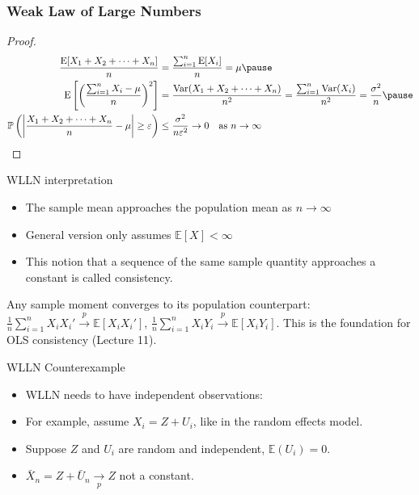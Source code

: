 \documentclass[handout, aspectratio=169]{beamer}
\numberwithin{equation}{section}
\begin{document}

\begin{frame}
\frametitle{Weak Law of Large Numbers}

\begin{proof}
\begin{align*}
\frac{\text{E}[X_{1} + X_{2} + \cdots + X_{n} ]}{n}
&= \frac{\sum_{i=1}^{n} \text{E}[X_{i}] }{n} = \mu
\pause \\
\text{E}\left[ \left( \frac{\sum_{i=1}^{n} X_{i} - \mu}{n} \right)^2 \right]
&= \frac{\text{Var}(X_{1} + X_{2} + \cdots + X_{n} )}{n^2}
= \frac{ \sum_{i=1}^{n} \text{Var}(X_{i}) }{n^2}
= \frac{\sigma^2}{n}
\pause \\
\mathbb{P}\left( \left| \frac{X_{1} + X_{2} + \cdots + X_{n} }{n} - \mu \right| \geq \varepsilon \right)
&\leq \frac{\sigma^2}{n \varepsilon^2} \rightarrow 0 \quad \text{as } n \to \infty
\end{align*}
\end{proof}

\end{frame}


\begin{frame}{WLLN interpretation}
\begin{itemize}
\item The sample mean approaches the population mean as $n\rightarrow \infty$\pause
\item General version only assumes $\mathbb{E}[X]<\infty$\pause
\item This notion that a sequence of the same sample quantity approaches a constant is called consistency.
\end{itemize}

\pause

\begin{tcolorbox}[colback=blue!5, colframe=blue!50]
Any sample moment converges to its population counterpart:
$\frac{1}{n}\sum_{i=1}^n X_i X_i' \overset{p}{\to} \mathbb{E}[X_i X_i']$, \;
$\frac{1}{n}\sum_{i=1}^n X_i Y_i \overset{p}{\to} \mathbb{E}[X_i Y_i]$.
This is the foundation for OLS consistency (Lecture 11).
\end{tcolorbox}

\end{frame}


\begin{frame}{WLLN Counterexample}
\begin{itemize}
\item WLLN needs to have independent observations:\pause
\item For example, assume $X_i=Z+U_i$, like in the random effects model.\pause
\item Suppose $Z$ and $U_i$ are random and independent, $\mathbb{E}(U_i)=0$.\pause
\item $\bar{X}_n=Z+\bar{U}_n\underset{p}{\to}Z$ not a constant.
\end{itemize}
\end{frame}
\end{document}
